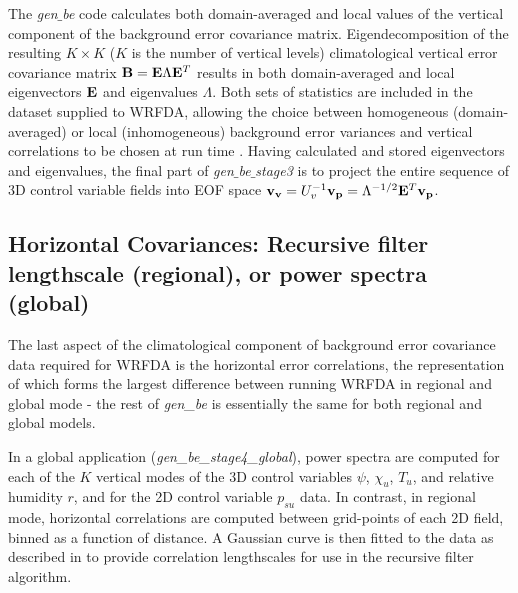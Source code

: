The {\it gen$\_$be} code calculates both domain-averaged and local
values of the vertical component of the background error covariance
matrix. Eigendecomposition of the resulting $K\times K$ ($K$ is the number of 
vertical levels) climatological vertical error covariance matrix ${\bf
B}={\bf E}{\Lambda}{\bf E}^{T}$ results in both domain-averaged and
local eigenvectors $\bf E$ and eigenvalues $\Lambda$. Both sets of
statistics are included in the dataset supplied to WRFDA, allowing
the choice between homogeneous (domain-averaged) or local
(inhomogeneous) background error variances and vertical correlations
to be chosen at run time \citet{barker04}.
Having calculated and stored eigenvectors and eigenvalues, the final
part of {\it gen$\_$be$\_$stage3} is to project the entire sequence of
3D control variable fields into EOF space ${\bf v_v}=U_{v}^{-1}{\bf
v_p}=\Lambda^{-1/2}{\bf E}^{T} {\bf v_p}$.

\subsection{Horizontal Covariances: Recursive filter lengthscale (regional), or power 
spectra (global)}

The last aspect of the climatological component of background error
covariance data required for WRFDA is the horizontal error
correlations, the representation of which forms the largest difference
between running WRFDA in regional and global mode - the rest of 
{\it gen\_be} is essentially the same for both regional and global models.

In a global application ({\it gen\_be\_stage4\_global}), power spectra
are computed for each of the $K$ vertical modes of the 3D control
variables $\psi$, $\chi_u$, $T_u$, and relative humidity $r$, and for the 2D control
variable $p_{su}$ data. In contrast, in regional mode, horizontal
correlations are computed between grid-points of each 2D field, binned
as a function of distance. A Gaussian curve is then fitted to the data
as described in \citet{barker04} to provide correlation lengthscales
for use in the recursive filter algorithm.

